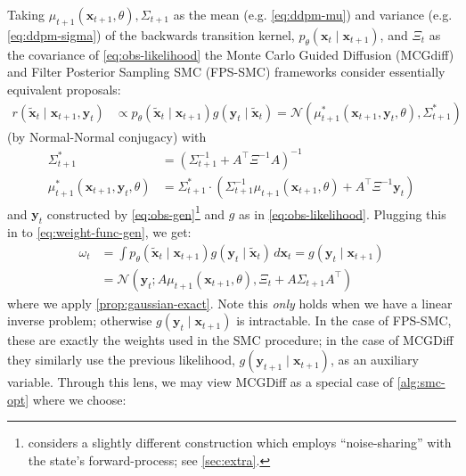Taking $\mu_{t+1}(\mathbf{x}_{t+1}, \theta), \Sigma_{t+1}$ as the mean (e.g. \autoref{eq:ddpm-mu}) and
variance (e.g. \autoref{eq:ddpm-sigma}) of the backwards transition kernel,
$p_\theta(\mathbf{x}_t \mid \mathbf{x}_{t+1})$, and $\Xi_t$ as the covariance of
\ref{eq:obs-likelihood} the Monte Carlo Guided Diffusion (MCGdiff)
\parencite{cardosoMonteCarloGuided2023} and Filter Posterior Sampling SMC (FPS-SMC)
\parencite{douDiffusionPosteriorSampling2023} frameworks consider essentially equivalent proposals:
\begin{align*}
    r(\tilde{\mathbf{x}}_{t} \mid \mathbf{x}_{t+1}, \mathbf{y}_t) &\propto p_\theta(\tilde{\mathbf{x}}_t \mid \mathbf{x}_{t+1})g(\mathbf{y}_{t} \mid \tilde{\mathbf{x}}_{t})
    = \mathcal{N}(\mu^{*}_{t+1}(\mathbf{x}_{t+1}, \mathbf{y}_t, \theta), \Sigma_{t+1}^{*})
\end{align*}
(by Normal-Normal conjugacy) with
\begin{align*}
    \Sigma_{t+1}^{*} &= \left(\Sigma_{t+1}^{-1} + A^\top \Xi^{-1} A \right)^{-1} \\
    \mu_{t+1}^{*}(\mathbf{x}_{t+1}, \mathbf{y}_t, \theta) &= \Sigma_{t+1}^{*}\cdot\left(\Sigma_{t+1}^{-1}\mu_{t+1}(\mathbf{x}_{t+1}, \theta) + A^\top \Xi^{-1} \mathbf{y}_t \right)
\end{align*}
and $\mathbf{y}_t$ constructed by \autoref{eq:obs-gen}\footnote{
\textcite{douDiffusionPosteriorSampling2023} considers a slightly different construction which
employs ``noise-sharing'' with the state's forward-process; see \ref{sec:extra}.} and $g$ as in
\autoref{eq:obs-likelihood}. Plugging this in to \autoref{eq:weight-func-gen}, we get:
\begin{align*}
    \omega_t &= \int p_\theta(\tilde{\mathbf{x}}_t \mid \mathbf{x}_{t+1})g(\mathbf{y}_{t} \mid \tilde{\mathbf{x}}_{t})\, d\mathbf{x}_t
    = g(\mathbf{y}_t \mid \mathbf{x}_{t+1}) \\
    &= \mathcal{N}\left(\mathbf{y}_t; A\mu_{t+1}(\mathbf{x}_{t+1}, \theta), \Xi_t + A\Sigma_{t+1}A^\top\right)
\end{align*}
where we apply \autoref{prop:gaussian-exact}. Note this \emph{only} holds when we have a linear inverse
problem; otherwise $g(\mathbf{y}_t \mid \mathbf{x}_{t+1})$ is intractable. In the case of FPS-SMC,
these are exactly the weights used in the SMC procedure; in the case of MCGDiff they similarly
use the previous likelihood, $g(\mathbf{y}_{t+1} \mid \mathbf{x}_{t+1})$, as an auxiliary variable.
Through this lens, we may view MCGDiff as a special case of \autoref{alg:smc-opt} where we choose:

